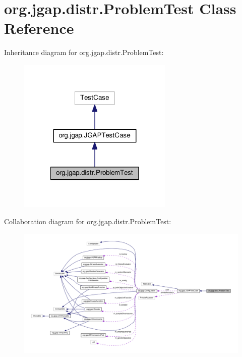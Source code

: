 \hypertarget{classorg_1_1jgap_1_1distr_1_1_problem_test}{\section{org.\-jgap.\-distr.\-Problem\-Test Class Reference}
\label{classorg_1_1jgap_1_1distr_1_1_problem_test}
}


Inheritance diagram for org.\-jgap.\-distr.\-Problem\-Test\-:
\nopagebreak
\begin{figure}[H]
\begin{center}
\leavevmode
\includegraphics[width=210pt]{classorg_1_1jgap_1_1distr_1_1_problem_test__inherit__graph}
\end{center}
\end{figure}


Collaboration diagram for org.\-jgap.\-distr.\-Problem\-Test\-:
\nopagebreak
\begin{figure}[H]
\begin{center}
\leavevmode
\includegraphics[width=350pt]{classorg_1_1jgap_1_1distr_1_1_problem_test__coll__graph}
\end{center}
\end{figure}
